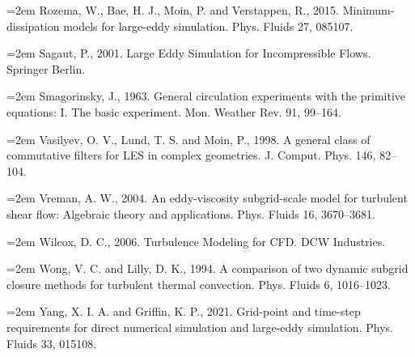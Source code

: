 \documentclass[12pt,a4paper,openany,fontset=none]{ctexbook}
\begin{document}
\par\hangindent=2em Rozema, W., Bae, H. J., Moin, P. and Verstappen, R., 2015. Minimum-dissipation models for large-eddy simulation. Phys. Fluids 27, 085107.
\par\hangindent=2em Sagaut, P., 2001. Large Eddy Simulation for Incompressible Flows. Springer Berlin.
\par\hangindent=2em Smagorinsky, J., 1963. General circulation experiments with the primitive equations: I. The basic experiment. Mon. Weather Rev. 91, 99–164.
\par\hangindent=2em Vasilyev, O. V., Lund, T. S. and Moin, P., 1998. A general class of commutative filters for LES in complex geometries. J. Comput. Phys. 146, 82–104.
\par\hangindent=2em Vreman, A. W., 2004. An eddy-viscosity subgrid-scale model for turbulent shear flow: Algebraic theory and applications. Phys. Fluids 16, 3670–3681.
\par\hangindent=2em Wilcox, D. C., 2006. Turbulence Modeling for CFD. DCW Industries.
\par\hangindent=2em Wong, V. C. and Lilly, D. K., 1994. A comparison of two dynamic subgrid closure methods for turbulent thermal convection. Phys. Fluids 6, 1016–1023.
\par\hangindent=2em Yang, X. I. A. and Griffin, K. P., 2021. Grid-point and time-step requirements for direct numerical simulation and large-eddy simulation. Phys. Fluids 33, 015108.
\end{document}
